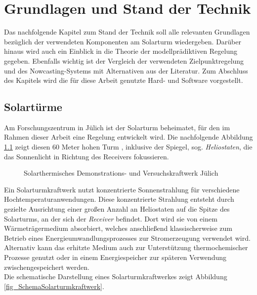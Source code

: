 \chapter{Grundlagen und Stand der Technik} \label{ch_StandTechnik}
Das nachfolgende Kapitel zum Stand der Technik soll alle relevanten Grundlagen bezüglich der verwendeten Komponenten am Solarturm wiedergeben.
Darüber hinaus wird auch ein Einblick in die Theorie der modellprädiktiven Regelung gegeben.
Ebenfalls wichtig ist der Vergleich der verwendeten Zielpunktregelung und des Nowcasting-Systems mit Alternativen aus der Literatur.
Zum Abschluss des Kapitels wird die für diese Arbeit genutzte Hard- und Software vorgestellt.

\section{Solartürme} \label{sec_Solartürme}
Am Forschungszentrum in Jülich ist der Solarturm beheimatet, für den im Rahmen dieser Arbeit eine Regelung entwickelt wird.
Die nachfolgende Abbildung \ref{fig_Solarturm} zeigt diesen 60 Meter hohen Turm \cite{DLRSolartürmeBild}, inklusive der Spiegel, sog. \textit{Heliostaten}, die das Sonnenlicht in Richtung des Receivers fokussieren.

\begin{figure}[h!]
    \centering
    \setlength{\fboxsep}{1pt}
    \setlength{\fboxrule}{1pt}
\caption[Solarthermisches Demonstrations- und Versuchskraftwerk Jülich]{Solarthermisches Demonstrations- und Versuchskraftwerk Jülich \cite{DLRSolartürmeBild}}
    \label{fig_Solarturm}
\end{figure}

Ein Solarturmkraftwerk nutzt konzentrierte Sonnenstrahlung für verschiedene Hochtemperaturanwendungen.
Diese konzentrierte Strahlung entsteht durch gezielte Ausrichtung einer großen Anzahl an Heliostaten auf die Spitze des Solarturms, an der sich der \textit{Receiver} befindet.
Dort wird sie von einem Wärmeträgermedium absorbiert, welches anschließend klassischerweise zum Betrieb eines Energieumwandlungsprozesses zur Stromerzeugung verwendet wird.
Alternativ kann das erhitzte Medium auch zur Unterstützung thermochemischer Prozesse genutzt oder in einem Energiespeicher zur späteren Verwendung zwischengespeichert werden. \cite[S.11]{DissBelhomme}\\
Die schematische Darstellung eines Solarturmkraftwerkes zeigt Abbildung \ref{fig_SchemaSolarturmkraftwerk}.

